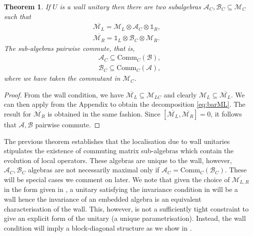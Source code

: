 \documentclass[11pt, twocolumn, floatfix, superscriptaddress, aps, prb, raggedbottom]{revtex4-2}
\newtheorem{theorem}{Theorem}[section]
\newcommand{\comm}{\mathrm{Comm}}
\newcommand{\Id}{\mathds{1}}
\begin{document}
\begin{theorem}
  If $U$ is a wall unitary then there are two subalgebras $\mathcal{A}_C, \mathcal{B}_C \subseteq \mathcal{M}_C$ such that 
  \begin{align}\label{eq:barML}
        \overline{\mathcal{M}_L}  = \mathcal{M}_L \otimes \mathcal{A}_C \otimes \Id_R, \\
        \overline{\mathcal{M}_R}  = \Id_L \otimes\mathcal{B}_C \otimes \mathcal{M}_R.
  \end{align}
  The sub-algebras pairwise commute, that is,
    \begin{align}
        &\mathcal{A}_C \subseteq \mathrm{Comm}_C(\mathcal{B}), \\
        &\mathcal{B}_C \subseteq \mathrm{Comm}_C(\mathcal{A}), 
    \end{align}
    \noindent where we have taken the commutant in $\mathcal{M}_C$.
    \label{thm:left_right_closure}
\end{theorem}
\begin{proof}
    From the wall condition, we have $\overline{\mathcal{M}_L} \subseteq \mathcal{M}_{LC}$ and clearly $\mathcal{M}_L \subseteq \overline{\mathcal{M}_L}$.
    We can then apply  from the Appendix to obtain the decomposition \eqref{eq:barML}.
    The result for $\overline{\mathcal{M}_R}$ is obtained in the same fashion.
    Since $[\overline{\mathcal{M}_L}, \overline{\mathcal{M}_R}] = 0$, it follows that $\mathcal{A}, \mathcal{B}$ pairwise commute.
\end{proof}
The previous theorem establishes that the localisation due to wall unitaries stipulates the existence of commuting matrix sub-algebras which contain the evolution of local operators. These algebras are unique to the wall, however, $\mathcal{A}_C, \mathcal{B}_C$ algebras are not necessarily maximal only if $\mathcal{A}_C = \comm_C(\mathcal{B}_C)$. These will be special cases we comment on later. We note that given the choice of $\overline{\mathcal{M}_{L,R}}$ in the form given in , a unitary satisfying the invariance condition in  will be a wall hence the invariance of an embedded algebra is an equivalent characterisation of the wall. This, however, is not a sufficiently tight constraint to give an explicit form of the unitary (a unique parametrisation). Instead, the wall condition will imply a block-diagonal structure as we show in .
\end{document}
